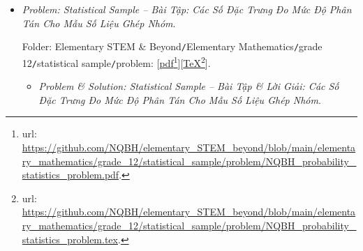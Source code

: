 \documentclass[12pt]{article}
\begin{document}
\begin{itemize}
	Folder: {\sf Elementary STEM \& Beyond{\tt/}Elementary Mathematics{\tt/}grade 12{\tt/}3D vector{\tt/}problem}: [\href{https://github.com/NQBH/elementary_STEM_beyond/blob/main/elementary_mathematics/grade_12/3D_vector/problem/NQBH_3D_vector_problem.pdf}{pdf}\footnote{{\sc url}: \url{https://github.com/NQBH/elementary_STEM_beyond/blob/main/elementary_mathematics/grade_12/3D_vector/problem/NQBH_3D_vector_problem.pdf}.}][\href{https://github.com/NQBH/elementary_STEM_beyond/blob/main/elementary_mathematics/grade_12/3D_vector/problem/NQBH_3D_vector_problem.tex}{\TeX}\footnote{{\sc url}: \url{https://github.com/NQBH/elementary_STEM_beyond/blob/main/elementary_mathematics/grade_12/3D_vector/problem/NQBH_3D_vector_problem.tex}.}].
	\begin{itemize}
		\item {\it Problem \& Solution: Coordinates of Vectors in 3D Space -- Bài Tập \& Lời Giải: Tọa Độ Của Vector Trong Không Gian}.
		
		Folder: {\sf Elementary STEM \& Beyond{\tt/}Elementary Mathematics{\tt/}grade 12{\tt/}3D vector {\tt/}solution}: [\href{https://github.com/NQBH/elementary_STEM_beyond/blob/main/elementary_mathematics/grade_12/3D_vector/solution/NQBH_3D_vector_solution.pdf}{pdf}\footnote{{\sc url}: \url{https://github.com/NQBH/elementary_STEM_beyond/blob/main/elementary_mathematics/grade_12/3D_vector/solution/NQBH_3D_vector_solution.pdf}.}][\href{https://github.com/NQBH/elementary_STEM_beyond/blob/main/elementary_mathematics/grade_12/3D_vector/solution/NQBH_3D_vector_solution.tex}{\TeX}\footnote{{\sc url}: \url{https://github.com/NQBH/elementary_STEM_beyond/blob/main/elementary_mathematics/grade_12/3D_vector/solution/NQBH_3D_vector_solution.tex}.}].
	\end{itemize}
	\item {\it Problem: Statistical Sample -- Bài Tập: Các Số Đặc Trưng Đo Mức Độ Phân Tán Cho Mẫu Số Liệu Ghép Nhóm}.
	
	Folder: {\sf Elementary STEM \& Beyond{\tt/}Elementary Mathematics{\tt/}grade 12{\tt/}statistical sample{\tt/}problem}: [\href{https://github.com/NQBH/elementary_STEM_beyond/blob/main/elementary_mathematics/grade_12/statistical_sample/problem/NQBH_probability_statistics_problem.pdf}{pdf}\footnote{{\sc url}: \url{https://github.com/NQBH/elementary_STEM_beyond/blob/main/elementary_mathematics/grade_12/statistical_sample/problem/NQBH_probability_statistics_problem.pdf}.}][\href{https://github.com/NQBH/elementary_STEM_beyond/blob/main/elementary_mathematics/grade_12/statistical_sample/problem/NQBH_probability_statistics_problem.tex}{\TeX}\footnote{{\sc url}: \url{https://github.com/NQBH/elementary_STEM_beyond/blob/main/elementary_mathematics/grade_12/statistical_sample/problem/NQBH_probability_statistics_problem.tex}.}].
	\begin{itemize}
		\item {\it Problem \& Solution: Statistical Sample -- Bài Tập \& Lời Giải: Các Số Đặc Trưng Đo Mức Độ Phân Tán Cho Mẫu Số Liệu Ghép Nhóm}.
		

\end{itemize}
\end{itemize}
\end{document}
